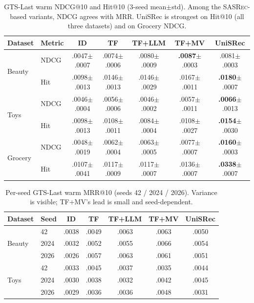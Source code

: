 \documentclass[sigconf,natbib=true,anonymous]{acmart}
\newcommand{\tfmv}{\textsc{TF+MV}\xspace}
\newcommand{\base}{\textsc{SASRec}\xspace}
\begin{document}
\begin{table}[t]
\centering
\caption{%
GTS-Last warm NDCG@10 and Hit@10 (3-seed mean$\pm$std).
Among the \base-based variants, NDCG agrees with MRR.
UniSRec is strongest on Hit@10 (all three datasets) and on Grocery NDCG.
}
\label{tab:ndcg_hit}
\small
\setlength{\tabcolsep}{2.5pt}
\begin{tabular}{@{}llccccc@{}}
\toprule
Dataset & Metric & ID & TF & TF+LLM & TF+MV & UniSRec \\
\midrule
\multirow{2}{*}{Beauty}
 & NDCG & .0047\tiny{$\pm$.0007} & .0074\tiny{$\pm$.0006} & .0080\tiny{$\pm$.0009} & \textbf{.0087}\tiny{$\pm$.0003} & .0081\tiny{$\pm$.0003} \\
 & Hit  & .0098\tiny{$\pm$.0013} & .0146\tiny{$\pm$.0013} & .0146\tiny{$\pm$.0029} & .0167\tiny{$\pm$.0011} & \textbf{.0180}\tiny{$\pm$.0007} \\
\midrule
\multirow{2}{*}{Toys}
 & NDCG & .0046\tiny{$\pm$.0004} & .0056\tiny{$\pm$.0006} & .0046\tiny{$\pm$.0002} & .0057\tiny{$\pm$.0011} & \textbf{.0066}\tiny{$\pm$.0013} \\
 & Hit  & .0098\tiny{$\pm$.0013} & .0108\tiny{$\pm$.0011} & .0084\tiny{$\pm$.0004} & .0108\tiny{$\pm$.0027} & \textbf{.0154}\tiny{$\pm$.0030} \\
\midrule
\multirow{2}{*}{Grocery}
 & NDCG & .0048\tiny{$\pm$.0019} & .0062\tiny{$\pm$.0004} & .0063\tiny{$\pm$.0005} & .0077\tiny{$\pm$.0007} & \textbf{.0160}\tiny{$\pm$.0003} \\
 & Hit  & .0107\tiny{$\pm$.0041} & .0117\tiny{$\pm$.0009} & .0117\tiny{$\pm$.0007} & .0136\tiny{$\pm$.0007} & \textbf{.0338}\tiny{$\pm$.0007} \\
\bottomrule
\end{tabular}
\end{table}

\begin{table}[t]
\centering
\caption{%
Per-seed GTS-Last warm MRR@10 (seeds 42 / 2024 / 2026).
Variance is visible; \tfmv's lead is small and seed-dependent.%
}
\label{tab:perseed}
\small
\setlength{\tabcolsep}{3pt}
\begin{tabular}{@{}llccccc@{}}
\toprule
Dataset & Seed & ID & TF & TF+LLM & TF+MV & UniSRec \\
\midrule
\multirow{3}{*}{Beauty}
 & 42    & .0038 & .0049 & .0063 & .0063 & .0050 \\
 & 2024  & .0032 & .0052 & .0055 & .0066 & .0054 \\
 & 2026  & .0026 & .0057 & .0063 & .0061 & .0051 \\
\midrule
\multirow{3}{*}{Toys}
 & 42    & .0033 & .0045 & .0037 & .0035 & .0044 \\
 & 2024  & .0030 & .0038 & .0032 & .0042 & .0045 \\
 & 2026  & .0029 & .0036 & .0036 & .0048 & .0031 \\
\bottomrule
\end{tabular}
\end{table}
\end{document}
